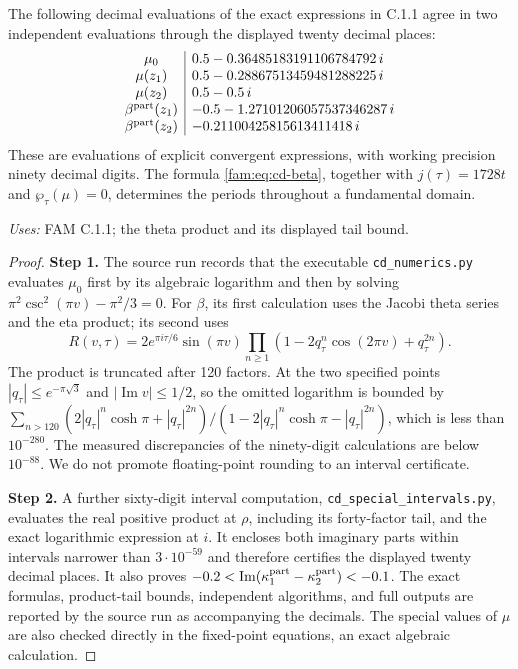 \begin{computed}[FAM C.1.2; T]\label{fam:C.1.2}
The following decimal evaluations of the exact expressions in C.1.1 agree
in two independent evaluations through the displayed twenty decimal places:
\[
\begin{array}{c|l}
\mu_0&0.5-0.36485183191106784792\,i\\
\mu(z_1)&0.5-0.28867513459481288225\,i\\
\mu(z_2)&0.5-0.5\,i\\
\beta^{\rm part}(z_1)&-0.5-1.27101206057537346287\,i\\
\beta^{\rm part}(z_2)&-0.21100425815613411418\,i
\end{array}
\]
These are evaluations of explicit convergent expressions, with working
precision ninety decimal digits. The formula \eqref{fam:eq:cd-beta}, together
with \(j(\tau)=1728t\) and \(\wp_\tau(\mu)=0\), determines the periods
throughout a fundamental domain.
\end{computed}
\noindent\textit{Uses:} FAM C.1.1; the theta product and its displayed tail bound.\par
\begin{proof}
\noindent\textbf{Step 1.} The source run records that the executable \texttt{cd\_numerics.py} evaluates \(\mu_0\) first by its
algebraic logarithm and then by solving
\(\pi^2\csc^2(\pi v)-\pi^2/3=0\). For \(\beta\), its first calculation uses
the Jacobi theta series and the eta product; its second uses
\[
 R(v,\tau)=2e^{\pi i\tau/6}\sin(\pi v)
 \prod_{n\geq1}(1-2q_\tau^n\cos(2\pi v)+q_\tau^{2n}).
\]
The product is truncated after 120 factors. At the two specified points
\(|q_\tau|\leq e^{-\pi\sqrt3}\) and \(|\operatorname{Im}v|\leq1/2\), so the
omitted logarithm is bounded by
\(\sum_{n>120}(2|q_\tau|^n\cosh\pi+|q_\tau|^{2n})/(1-2|q_\tau|^n\cosh\pi-|q_\tau|^{2n})\),
which is less than \(10^{-280}\). The measured discrepancies of the
ninety-digit calculations are below \(10^{-88}\). We do not promote floating-point rounding to an interval certificate.


\noindent\textbf{Step 2.} 
A further sixty-digit interval computation, \texttt{cd\_special\_intervals.py},
evaluates the real positive product at $\rho$, including its forty-factor
tail, and the exact logarithmic expression at $i$. It encloses both
imaginary parts within intervals narrower than $3\cdot10^{-59}$ and
therefore certifies the displayed twenty decimal places. It also proves
$-0.2<\operatorname{Im}(\kappa_1^{\rm part}-\kappa_2^{\rm part})<-0.1$.
The exact formulas, product-tail bounds, independent algorithms, and
full outputs are reported by the source run as accompanying the decimals. The special values of \(\mu\) are also checked directly in
the fixed-point equations, an exact algebraic calculation.
\end{proof}

